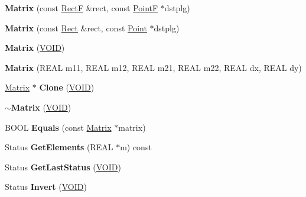 \begin{DoxyCompactItemize}
\item 
\mbox{\label{class_matrix_aad4d7fbdbaff308f23b44b1fa36af89a}} 
{\bfseries Matrix} (const \hyperlink{struct_rect_f}{RectF} \&rect, const \hyperlink{struct_point_f}{PointF} $\ast$dstplg)
\item 
\mbox{\label{class_matrix_a1ff35bf60eb6683a5f0f60a6f9c2d50c}} 
{\bfseries Matrix} (const \hyperlink{struct_rect}{Rect} \&rect, const \hyperlink{struct_point}{Point} $\ast$dstplg)
\item 
\mbox{\label{class_matrix_a17de8b1823b85df4b2a8efd9811cdb4c}} 
{\bfseries Matrix} (\hyperlink{interfacevoid}{V\+O\+ID})
\item 
\mbox{\label{class_matrix_a3bba37702eee3792dbd90be1005c2264}} 
{\bfseries Matrix} (R\+E\+AL m11, R\+E\+AL m12, R\+E\+AL m21, R\+E\+AL m22, R\+E\+AL dx, R\+E\+AL dy)
\item 
\mbox{\label{class_matrix_ad0a799115e607c805b58cf0b063bc53e}} 
\hyperlink{class_matrix}{Matrix} $\ast$ {\bfseries Clone} (\hyperlink{interfacevoid}{V\+O\+ID})
\item 
\mbox{\label{class_matrix_a39251e766949e7a9b2b90b696c897b6c}} 
{\bfseries $\sim$\+Matrix} (\hyperlink{interfacevoid}{V\+O\+ID})
\item 
\mbox{\label{class_matrix_a706659bb0d78008f69609e3d3a3d45e5}} 
B\+O\+OL {\bfseries Equals} (const \hyperlink{class_matrix}{Matrix} $\ast$matrix)
\item 
\mbox{\label{class_matrix_a2d42505d01a1385ef713bbc419020f00}} 
Status {\bfseries Get\+Elements} (R\+E\+AL $\ast$m) const
\item 
\mbox{\label{class_matrix_a7ab95e83c2f167897a3a0a71a3522a67}} 
Status {\bfseries Get\+Last\+Status} (\hyperlink{interfacevoid}{V\+O\+ID})
\item 
\mbox{\label{class_matrix_afbc3dd6b6023db5154f96bc09a77913c}} 
Status {\bfseries Invert} (\hyperlink{interfacevoid}{V\+O\+ID})

\end{DoxyCompactItemize}
